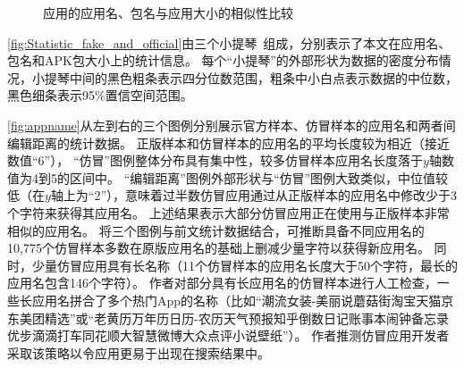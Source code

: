 \begin{figure}[htbp]
    \centering
    \hfill
    \hfill
    \hfill
    \caption{应用的应用名、包名与应用大小的相似性比较}
    \label{fig:Statistic_fake_and_official}
    \vspace{-5mm}
\end{figure}

\autoref{fig:Statistic_fake_and_official}由三个小提琴~\cite{violinplot}组成，分别表示了本文在应用名、包名和APK包大小上的统计信息。
每个``小提琴''的外部形状为数据的密度分布情况，小提琴中间的黑色粗条表示四分位数范围，粗条中小白点表示数据的中位数，黑色细条表示95\%置信空间范围。

\autoref{fig:appname}从左到右的三个图例分别展示官方样本、仿冒样本的应用名和两者间编辑距离的统计数据。
正版样本和仿冒样本的应用名的平均长度较为相近（接近数值``6''），
``仿冒''图例整体分布具有集中性，较多仿冒样本应用名长度落于$y$轴数值为4到5的区间中。
``编辑距离''图例外部形状与``仿冒''图例大致类似，中位值较低（在$y$轴上为``2''），意味着过半数仿冒应用通过从正版样本的应用名中修改少于3个字符来获得其应用名。
上述结果表示大部分仿冒应用正在使用与正版样本非常相似的应用名。
将三个图例与前文统计数据结合，可推断具备不同应用名的10,775个仿冒样本多数在原版应用名的基础上删减少量字符以获得新应用名。
同时，少量仿冒应用具有长名称（11个仿冒样本的应用名长度大于50个字符，最长的应用名包含146个字符）。
作者对部分具有长应用名的仿冒样本进行人工检查，一些长应用名拼合了多个热门App的名称（比如``潮流女装-美丽说蘑菇街淘宝天猫京东美团精选''或``老黄历万年历日历-农历天气预报知乎倒数日记账事本闹钟备忘录优步滴滴打车同花顺大智慧微博大众点评小说壁纸''）。
作者推测仿冒应用开发者采取该策略以令应用更易于出现在搜索结果中。

